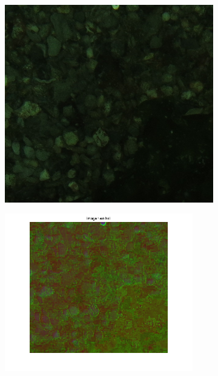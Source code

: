 \documentclass{article}
\begin{document}
\begin{figure}[H]
	\begin{subfigure}{0.5\textwidth}
	\centering
        \includegraphics[scale=0.5]{1892xxx.png}
    \end{subfigure}\hfill
	\begin{subfigure}{0.5\textwidth}
	\centering
        \includegraphics[width=0.9\textwidth]{1892xxx-hsi.png}
    \end{subfigure}\hfill

\end{figure}
\end{document}
